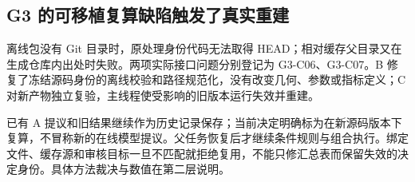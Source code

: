 \subsection{G3 的可移植复算缺陷触发了真实重建}
离线包没有 Git 目录时，原处理身份代码无法取得 HEAD；相对缓存父目录又在生成仓库内出处时失败。两项实际接口问题分别登记为 G3-C06、G3-C07。B 修复了冻结源码身份的离线校验和路径规范化，没有改变几何、参数或指标定义；C 对新产物独立复验，主线程使受影响的旧版本运行失效并重建。

已有 A 提议和旧结果继续作为历史记录保存；当前决定明确标为在新源码版本下复算，不冒称新的在线模型提议。父任务恢复后才继续条件规则与组合执行。绑定文件、缓存源和审核目标一旦不匹配就拒绝复用，不能只修汇总表而保留失效的决定身份。具体方法裁决与数值在第二层说明。


